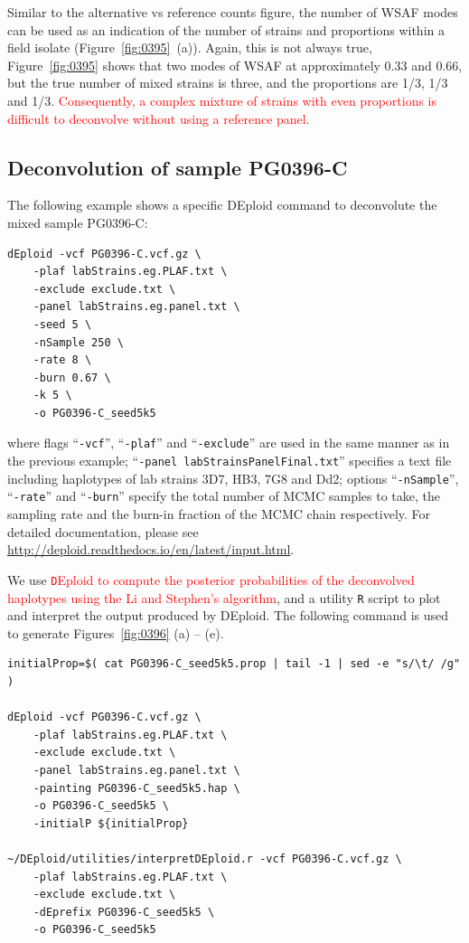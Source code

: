 \documentclass{article}
\begin{document}
Similar to the alternative vs reference counts figure, the number of WSAF modes can be used as an indication of the number of strains and proportions within a field isolate (Figure~\ref{fig:0395}~(a)). Again, this is not always true, Figure~\ref{fig:0395} shows that two modes of WSAF at approximately 0.33 and 0.66, but the true number of mixed strains is three, and the proportions are 1/3, 1/3 and 1/3. \textcolor{red}{Consequently, a complex mixture of strains with even proportions is difficult to deconvolve without using a reference panel.}


\subsection{Deconvolution of sample {\textmd PG0396-C}}
The following example shows a specific {\textmd DEploid} command to deconvolute the mixed sample {\textmd PG0396-C}:
\linespread{1}
\begin{lstlisting}
dEploid -vcf PG0396-C.vcf.gz \
    -plaf labStrains.eg.PLAF.txt \
    -exclude exclude.txt \
    -panel labStrains.eg.panel.txt \
    -seed 5 \
    -nSample 250 \
    -rate 8 \
    -burn 0.67 \
    -k 5 \
    -o PG0396-C_seed5k5
\end{lstlisting}
\linespread{1.5}
where flags ``{\tt -vcf}'', ``{\tt -plaf}'' and ``{\tt -exclude}'' are used in the same manner as in the previous example; ``{\tt -panel labStrainsPanelFinal.txt}'' specifies a text file including haplotypes of lab strains 3D7, HB3, 7G8 and Dd2; options ``{\tt -nSample}'', ``{\tt -rate}'' and ``{\tt -burn}'' specify the total number of MCMC samples to take, the sampling rate and the burn-in fraction of the MCMC chain respectively. For detailed documentation, please see \url{http://deploid.readthedocs.io/en/latest/input.html}.


We use \textcolor{red}{{\texttt DEploid} to compute the posterior probabilities of the deconvolved haplotypes using the Li and Stephen's algorithm}, and a utility {\tt R} script to plot and interpret the output produced by DEploid. The following command is used to generate Figures~\ref{fig:0396} (a) -- (e).
\linespread{1}
\begin{lstlisting}
initialProp=$( cat PG0396-C_seed5k5.prop | tail -1 | sed -e "s/\t/ /g" )

dEploid -vcf PG0396-C.vcf.gz \
    -plaf labStrains.eg.PLAF.txt \
    -exclude exclude.txt \
    -panel labStrains.eg.panel.txt \
    -painting PG0396-C_seed5k5.hap \
    -o PG0396-C_seed5k5 \
    -initialP ${initialProp}

~/DEploid/utilities/interpretDEploid.r -vcf PG0396-C.vcf.gz \
    -plaf labStrains.eg.PLAF.txt \
    -exclude exclude.txt \
    -dEprefix PG0396-C_seed5k5 \
    -o PG0396-C_seed5k5
\end{lstlisting}
\linespread{1.5}
\end{document}
